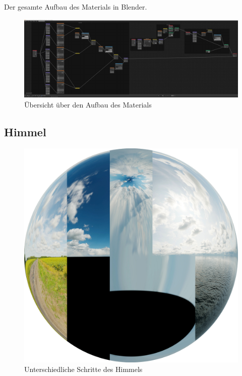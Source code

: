 Der gesamte Aufbau des Materials in Blender.

\begin{figure}[H]
\includegraphics[width=\textwidth]{gfx/prod/env/ocean_shader.jpg}
\caption{Übersicht über den Aufbau des Materials}
\label{ocean_shader}
\end{figure}

\subsection{Himmel}

\begin{figure}[H]
\includegraphics[width=\textwidth]{gfx/prod/env/env.jpg}
\caption{Unterschiedliche Schritte des Himmels}
\label{env}
\end{figure}

